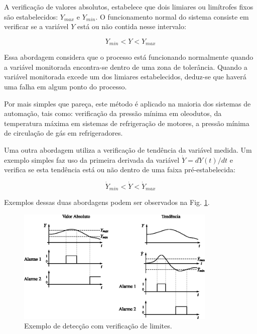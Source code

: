 A verificação de valores absolutos, estabelece que dois limiares ou limítrofes
fixos são estabelecidos: $Y_{max}$ e $Y_{min}$. O funcionamento normal do
sistema consiste em verificar se a variável $Y$ está ou não contida nesse
intervalo:

\begin{equation}
Y_{min} < Y < Y_{max}
\end{equation}

Essa abordagem considera que o processo está funcionando normalmente quando a
variável monitorada encontra-se dentro de uma zona de tolerância. Quando a
variável monitorada excede um dos limiares estabelecidos, deduz-se que haverá
uma falha em algum ponto do processo.

Por mais simples que pareça, este método é aplicado na maioria dos sistemas de
automação, tais como: verificação da pressão mínima em oleodutos, da temperatura
máxima em sistemas de refrigeração de motores, a pressão mínima de circulação de
gás em refrigeradores.

Uma outra abordagem utiliza a verificação de tendência da variável medida. Um
exemplo simples faz uso da primeira derivada da variável $\dot{Y} = dY(t)/dt$ e
verifica se esta tendência está ou não dentro de uma faixa pré-estabelecida:

\begin{equation}
\dot{Y}_{min} < \dot{Y} < \dot{Y}_{max}
\end{equation}

Exemplos dessas duas abordagens podem ser observados na Fig.
\ref{fig:detec_ver_lim}.

\begin{figure}[htb]
\centering
    \includegraphics[width=0.85\textwidth]{imgs/detec_diag/eps/detec_ver_lim}
    \caption{Exemplo de detecção com verificação de limites.}
    \label{fig:detec_ver_lim}
\end{figure}


